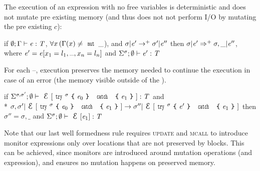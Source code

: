 The execution of an expression
with no \Q@mut@ free variables is deterministic and does not
mutate pre existing memory (and thus does not not perform I/O by mutating the pre existing $c$):\saveSpace\saveSpace
\begin{Assumption}[Determinism]\rm
	if $\emptyset;\Gamma\vdash {\ensuremath{\mathit{e}}}:{\mathit{T}}$, 
	$\forall x\, ( \Gamma(x)\neq\Kw{mut}\,\_$), and
	$\sigma | {\mathit{e}}'\rightarrow^+ \sigma' | {\mathit{e}}''$
	then 
	$\sigma | {\mathit{e}}'\Rightarrow^+ \sigma,\_ | {\mathit{e}}''$,
	where $\e'=\e[x_1=l_1,\ldots,x_n=l_n]$ and $\Sigma^\sigma;\emptyset\vdash {\ensuremath{\mathit{e}}}':{\mathit{T}}$
\end{Assumption}

For each \Q@try@--\Q@catch@, execution preserves the memory needed to continue the execution in case of an error (the memory visible outside of the \Q@try@).\saveSpace\saveSpace
\begin{Assumption}\rm
	if $\Sigma^{\sigma,\sigma'};\emptyset\vdash \ctx[\Kw{try}^\sigma\oC\e_0\cC\ \Kw{catch}\ \oC\e_1\cC]:\T$
	and\\*
	$
	\sigma,\sigma'|\ctx[\Kw{try}^\sigma\oC\e_0\cC\ \Kw{catch}\ \oC\e_1\cC]\rightarrow 
	\sigma''|\ctx[\Kw{try}^\sigma\oC\e'\cC\ \Kw{catch}\ \oC\e_1\cC]
	$
	then 
	$\sigma''=\sigma,\_$
	and
	$\Sigma^\sigma;\emptyset\vdash \ctx[\e_1]:\T$
\end{Assumption}


Note that our last well formedness rule requires 
\textsc{update} and \textsc{mcall} to introduce
monitor expressions only over locations
that are not preserved by \Q@try@ blocks.
This can be achieved, since monitors are introduced
around mutation operations
(and \Q@new@ expression),
and  ensures no mutation happens on preserved memory.




